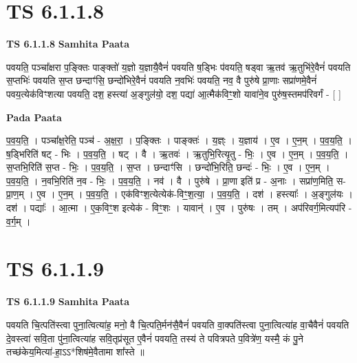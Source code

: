 \documentclass[17pt]{extarticle}
\begin{document}

\section{ TS 6.1.1.8 }

\textbf{TS 6.1.1.8 } \newline
\textbf{Samhita Paata} \newline

पवयति॒ पञ्चा᳚क्षरा प॒ङ्क्तिः पाङ्क्तो॑ य॒ज्ञो य॒ज्ञायै॒वैनं॑ पवयति ष॒ड्भिः प॑वयति॒ षड्वा ऋ॒तव॑ ऋ॒तुभि॑रे॒वैनं॑ पवयति स॒प्तभिः॑ पवयति स॒प्त छन्दाꣳ॑सि॒ छन्दो॑भिरे॒वैनं॑ पवयति न॒वभिः॑ पवयति॒ नव॒ वै पुरु॑षे प्रा॒णाः सप्रा॑णमे॒वैनं॑ पवय॒त्येक॑विꣳशत्या पवयति॒ दश॒ हस्त्या॑ अ॒ङ्गुल॑यो॒ दश॒ पद्या॑ आ॒त्मैक॑विꣳ॒॒शो यावा॑ने॒व पुरु॑ष॒स्तमप॑रिवर्गं - [  ] \newline

\textbf{Pada Paata} \newline

प॒व॒य॒ति॒ । पञ्चा᳚क्ष॒रेति॒ पञ्च॑ - अ॒क्ष॒रा॒ । प॒ङ्क्तिः । पाङ्क्तः॑ । य॒ज्ञ्ः । य॒ज्ञाय॑ । ए॒व । ए॒न॒म् । प॒व॒य॒ति॒ । ष॒ड्भिरिति॑ षट् - भिः । प॒व॒य॒ति॒ । षट् । वै । ऋ॒तवः॑ । ऋ॒तुभि॒रित्यृ॒तु - भिः॒ । ए॒व । ए॒न॒म् । प॒व॒य॒ति॒ । स॒प्तभि॒रिति॑ स॒प्त - भिः॒ । प॒व॒य॒ति॒ । स॒प्त । छन्दाꣳ॑सि । छन्दो॑भि॒रिति॒ छन्दः॑ - भिः॒ । ए॒व । ए॒न॒म् । प॒व॒य॒ति॒ । न॒वभि॒रिति॑ न॒व - भिः॒ । प॒व॒य॒ति॒ । नव॑ । वै । पुरु॑षे । प्रा॒णा इति॑ प्र - अ॒नाः । सप्रा॑ण॒मिति॒ स-प्रा॒ण॒म् । ए॒व । ए॒न॒म् । प॒व॒य॒ति॒ । एक॑विꣳश॒त्येत्येक॑-विꣳ॒॒श॒त्या॒ । प॒व॒य॒ति॒ । दश॑ । हस्त्याः᳚ । अ॒ङ्गुल॑यः । दश॑ । पद्याः᳚ । आ॒त्मा । ए॒क॒विꣳ॒॒श इत्येक॑ - विꣳ॒॒शः । यावान्॑ । ए॒व । पुरु॑षः । तम् । अप॑रिवर्ग॒मित्यप॑रि - व॒र्ग॒म् ।  \newline





\section{ TS 6.1.1.9 }

\textbf{TS 6.1.1.9 } \newline
\textbf{Samhita Paata} \newline

पवयति चि॒त्पति॑स्त्वा पुना॒त्वित्या॑ह॒ मनो॒ वै चि॒त्पति॒र्मन॑सै॒वैनं॑ पवयति वा॒क्पति॑स्त्वा पुना॒त्वित्या॑ह वा॒चैवैनं॑ पवयति दे॒वस्त्वा॑ सवि॒ता पु॑ना॒त्वित्या॑ह सवि॒तृप्र॑सूत ए॒वैनं॑ पवयति॒ तस्य॑ ते पवित्रपते प॒वित्रे॑ण॒ यस्मै॒ कं पु॒ने तच्छ॑केय॒मित्या॑-हा॒ऽऽ*शिष॑मे॒वैतामा शा᳚स्ते ॥ \newline
\end{document}
